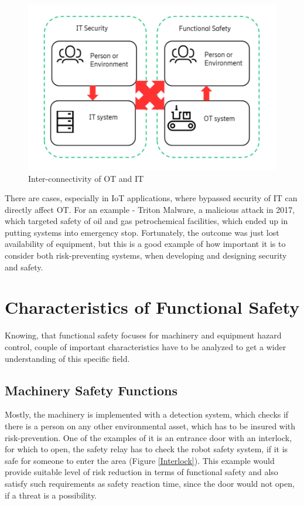 \documentclass[conference]{IEEEtran}
\begin{document}
\begin{figure}[htbp]
\centerline{\includegraphics[scale=.45]{OT_IT.png}}
\caption{Inter-connectivity of OT and IT \cite{tomur_sok_2021}}
\label{OTIT}
\end{figure}

There are cases, especially in IoT applications, where bypassed security of IT can directly affect OT. For an example - Triton Malware, a malicious attack in 2017, which targeted safety of oil and gas petrochemical facilities, which ended up in putting systems into emergency stop. Fortunately, the outcome was just lost availability of equipment, but this is a good example of how important it is to consider both risk-preventing systems, when developing and designing security and safety.

\section{Characteristics of Functional Safety}

Knowing, that functional safety focuses for machinery and equipment hazard control, couple of important characteristics have to be analyzed to get a wider understanding of this specific field.

\subsection{Machinery Safety Functions}

Mostly, the machinery is implemented with a detection system, which checks if there is a person on any other environmental asset, which has to be insured with risk-prevention. One of the examples of it is an entrance door with an interlock, for which to open, the safety relay has to check the robot safety system, if it is safe for someone to enter the area (Figure \ref{Interlock}). This example would provide suitable level of risk reduction in terms of functional safety and also satisfy such requirements as safety reaction time, since the door would not open, if a threat is a possibility.
\end{document}

